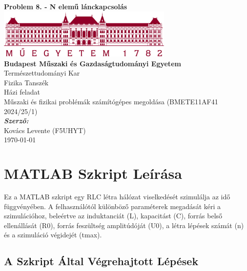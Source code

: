 \documentclass[12pt,a4paper]{article}
\begin{document}
\begin{titlepage}
    \centering
    \vspace*{\fill}
    \textbf{\Huge Problem 8. - N elemű lánckapcsolás}\\[2cm]
    \includegraphics[width=0.65\textwidth]{figures/bme_logo_nagy_bordo.jpg}\\[1cm]
    \textbf{\Large Budapest Műszaki és Gazdaságtudományi Egyetem}\\[0.25cm]
    \Large Természettudományi Kar\\[0.25cm]
    \Large Fizika Tanszék\\[2cm]
    \Large Házi feladat\\[0.25cm]
    \Large Műszaki és fizikai problémák számítógépes megoldása (BMETE11AF41 2024/25/1)\\[2cm]
    \Large \textbf{\textit{Szerző:}}\\[0.25cm]
    \Large Kovács Levente (F5UHYT)\\[1cm]
    \Large \today
    \vspace*{\fill}
\end{titlepage}
\newpage

\tableofcontents
\newpage

\section*{MATLAB Szkript Leírása}

Ez a MATLAB szkript egy RLC létra hálózat viselkedését szimulálja az idő függvényében. A felhasználótól különböző paraméterek megadását kéri a szimulációhoz, beleértve az induktanciát (L), kapacitást (C), forrás belső ellenállását (R0), forrás feszültség amplitúdóját (U0), a létra lépések számát (n) és a szimuláció végidejét (tmax).

\subsection*{A Szkript Által Végrehajtott Lépések}
\end{document}
